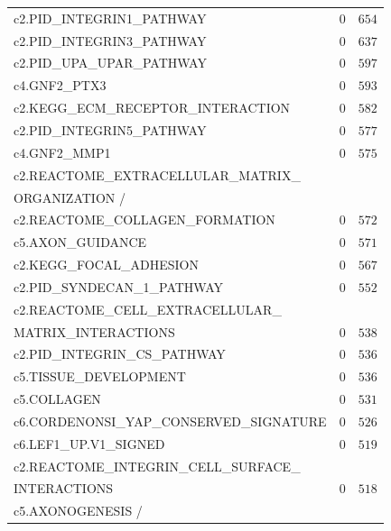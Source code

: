 \begin{longtable}[!htbp]{ l r@{.}l }
c2.PID\_INTEGRIN1\_PATHWAY                          & $0$ & $654$       \\
c2.PID\_INTEGRIN3\_PATHWAY                          & $0$ & $637$       \\
c2.PID\_UPA\_UPAR\_PATHWAY                          & $0$ & $597$       \\
c4.GNF2\_PTX3                                       & $0$ & $593$       \\
c2.KEGG\_ECM\_RECEPTOR\_INTERACTION                 & $0$ & $582$       \\
c2.PID\_INTEGRIN5\_PATHWAY                          & $0$ & $577$       \\
c4.GNF2\_MMP1                                       & $0$ & $575$       \\
c2.REACTOME\_EXTRACELLULAR\_MATRIX\_                                    \\
\qquad ORGANIZATION /                                                   \\
\qquad c2.REACTOME\_COLLAGEN\_FORMATION             & $0$ & $572$       \\
c5.AXON\_GUIDANCE                                   & $0$ & $571$       \\
c2.KEGG\_FOCAL\_ADHESION                            & $0$ & $567$       \\
c2.PID\_SYNDECAN\_1\_PATHWAY                        & $0$ & $552$       \\
c2.REACTOME\_CELL\_EXTRACELLULAR\_                                      \\
\qquad MATRIX\_INTERACTIONS                         & $0$ & $538$       \\
c2.PID\_INTEGRIN\_CS\_PATHWAY                       & $0$ & $536$       \\
c5.TISSUE\_DEVELOPMENT                              & $0$ & $536$       \\
c5.COLLAGEN                                         & $0$ & $531$       \\
c6.CORDENONSI\_YAP\_CONSERVED\_SIGNATURE            & $0$ & $526$       \\
c6.LEF1\_UP.V1\_SIGNED                              & $0$ & $519$       \\
c2.REACTOME\_INTEGRIN\_CELL\_SURFACE\_                                  \\
\qquad INTERACTIONS                                 & $0$ & $518$       \\
c5.AXONOGENESIS /                                                       \\

\end{longtable}
